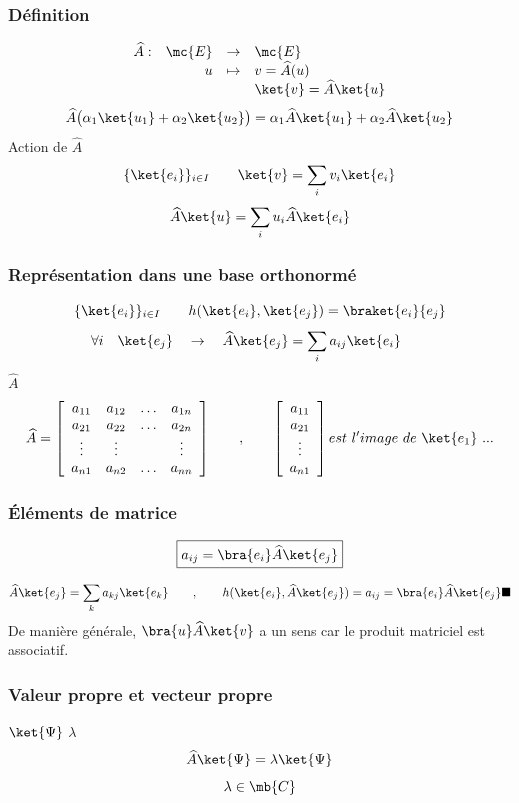 \subsubsection{Définition} %

\newcommand{\wA}[0]{\widehat A}
\[
\begin{array}{ c r c l }
 \wA : & \mc{E} & \to & \mc{E} \\
  & u & \mapsto & v=\wA (u) \\
  &  &  & \ket{v}=\wA \ket{u} \\
\end{array}
\]
\[
\wA \big(\alpha_1\ket{u_1}+\alpha_2\ket{u_2}\big)=
\alpha_1\wA \ket{u_1}+\alpha_2\wA \ket{u_2}
\]
Action de $\wA$
\[
\{\ket{e_i}\}_{i\in I}\qquad\ket{v}=\sum_iv_i\ket{e_i}
\]
\[
\wA\ket{u}=\sum_iu_i\wA\ket{e_i}
\]
\subsubsection{Représentation dans une base orthonormé} %
\[
\{\ket{e_i}\}_{i\in I}\qquad h(\ket{e_i},\ket{e_j})=\braket{e_i}{e_j}
\]
\[
\forall i\quad\ket{e_j}\quad\to\quad\wA\ket{e_j}=\sum_ia_{ij}\ket{e_i}\qquad
\]
$\wA$
\[
\wA=\left[\begin{array}{ c c c c }
 a_{11} & a_{12} & \ldots & a_{1n} \\
 a_{21} & a_{22} & \ldots & a_{2n} \\
 \vdots & \vdots &  & \vdots \\
 a_{n1} & a_{n2} & \ldots & a_{nn} \\
\end{array}\right]
\qquad,\qquad\left[\begin{array}{ c }
 a_{11} \\
 a_{21} \\
 \vdots \\
 a_{n1} \\
\end{array}\right]
est\ l'image\ de\ \ket{e_1}\ ...
\]
\subsubsection{Éléments de matrice} %
\[
\boxed{a_{ij}=\bra{e_i}\wA\ket{e_j}}
\]

{\footnotesize
\[
\wA\ket{e_j}=\sum_ka_{kj}\ket{e_k}\qquad,\qquad
h(\ket{e_i},\wA\ket{e_j})=a_{ij}=\bra{e_i}\wA\ket{e_j}
\blacksquare\]}
De manière générale, $\bra{u}\wA\ket{v}$ a un sens car le produit matriciel est associatif.
 
\subsubsection{Valeur propre et vecteur propre} %
$\ket{\Psi}$ $\lambda$
\[
\wA\ket{\Psi}=\lambda\ket{\Psi}
\]
\[
\lambda\in\mb{C}
\]

